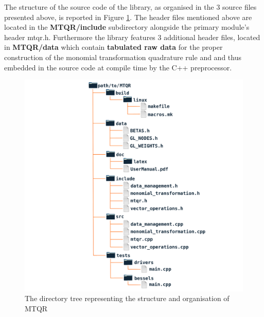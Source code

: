 \documentclass[a4paper, twosided]{book}
\begin{document}
\noindent
The structure of the source code of the library, as organised in the $3$ source files presented above, is reported in Figure \ref{Fig2.1}. The header files mentioned above are located in the \colorbox{poliGrayBlue}{\textbf{MTQR/include}} subdirectory alongside the primary module's header \colorbox{poliGrayBlue}{mtqr.h}. Furthermore the library features $3$ additional header files, located in \colorbox{poliGrayBlue}{\textbf{MTQR/data}} which contain \color{poliDarkBlue} \textbf{tabulated raw data} \color{black} for the proper construction of the monomial transformation quadrature rule and and thus embedded in the source code at compile time by the C++ preprocessor.

\newpage
\begin{center}
        \begin{figure}[H]
        \centering
        \includegraphics[keepaspectratio, width=.6\textwidth]{images/Fig2_1.png}
        \caption{The directory tree representing the structure and organisation of MTQR}
        \label{Fig2.1}
        \end{figure}
\end{center}
\end{document}
